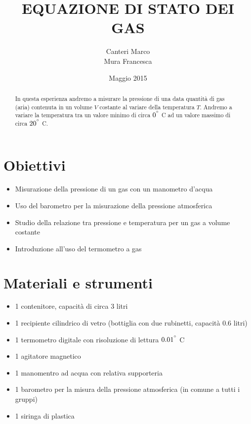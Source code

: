 \documentclass[12pt,titlepage]{article}
\title{\textbf{EQUAZIONE DI STATO DEI GAS} }
\author{Canteri Marco\\Mura Francesca}
\date{Maggio 2015}
\begin{document}
	\maketitle
	\tableofcontents
	\renewcommand{\abstractname}{Abstract}
	
	\begin{abstract}
In questa esperienza andremo a misurare la pressione di una data quantità di gas (aria) contenuta in un volume $V$ costante al variare della temperatura $T$.
Andremo a variare la temperatura tra un valore minimo di circa $0^{\degree}$ C ad un valore massimo di circa $20^{\degree}$ C.
	\end{abstract}
	
\newpage
\section{Obiettivi}
\begin{itemize}
\item Misurazione della pressione di un gas con un manometro d'acqua
\item Uso del barometro per la misurazione della pressione atmosferica
\item Studio della relazione tra pressione e temperatura per un gas a volume costante
\item Introduzione all'uso del termometro a gas
\end{itemize}

\section{Materiali e strumenti}
\begin{itemize}
\item 1 contenitore, capacità di circa 3 litri
\item 1 recipiente cilindrico di vetro (bottiglia con due rubinetti, capacità 0.6 litri)
\item 1 termometro digitale con risoluzione di lettura $0.01^{\degree}$ C
\item 1 agitatore magnetico
\item 1 manomentro ad acqua con relativa supporteria
\item 1 barometro per la misura della pressione atmosferica (in comune a tutti i gruppi)
\item 1 siringa di plastica
\end{itemize}

\newpage


\newpage

\newpage

\end{document}

